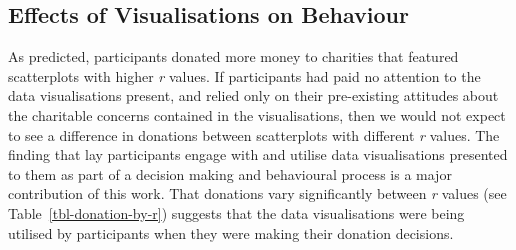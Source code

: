 \documentclass[
  authoryear,
  preprint,
  3p]{elsarticle}
\begin{document}
\subsection{Effects of Visualisations on
Behaviour}\label{effects-of-visualisations-on-behaviour}

\begin{table}

\caption{\label{tbl-RT-by-trial}Mean reaction times (RT) for trials
featuring two different scatterplots, two alternative scatterplots, and
two standard scatterplots.}


\end{table}%

As predicted, participants donated more money to charities that featured
scatterplots with higher \emph{r} values. If participants had paid no
attention to the data visualisations present, and relied only on their
pre-existing attitudes about the charitable concerns contained in the
visualisations, then we would not expect to see a difference in
donations between scatterplots with different \emph{r} values. The
finding that lay participants engage with and utilise data
visualisations presented to them as part of a decision making and
behavioural process is a major contribution of this work. That donations
vary significantly between \emph{r} values (see
Table~\ref{tbl-donation-by-r}) suggests that the data visualisations
were being utilised by participants when they were making their donation
decisions.
\end{document}
